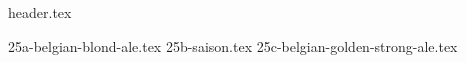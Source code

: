 \clearpage
{}
\divisorLine
{header.tex}
\begin{multicols*}{2}
{25a-belgian-blond-ale.tex}
{25b-saison.tex}
{25c-belgian-golden-strong-ale.tex}
\end{multicols*}